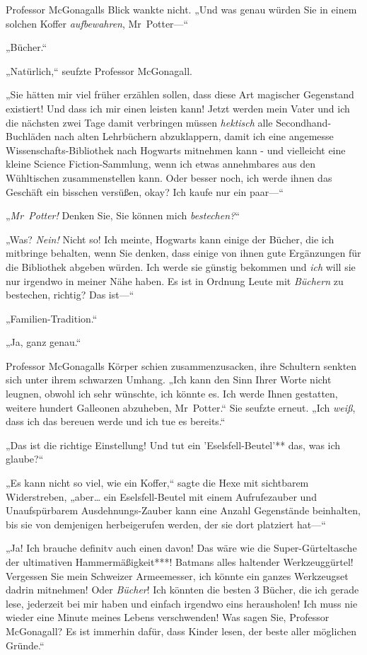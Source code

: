 {Professor McGonagalls Blick wankte nicht. „Und was genau würden Sie in einem solchen Koffer \emph{aufbewahren}, Mr~Potter—“

„Bücher.“

„Natürlich,“ seufzte Professor McGonagall.

„Sie hätten mir viel früher erzählen sollen, dass diese Art magischer Gegenstand existiert! Und dass ich mir einen leisten kann! Jetzt werden mein Vater und ich die nächsten zwei Tage damit verbringen müssen \emph{hektisch} alle Secondhand-Buchläden nach alten Lehrbüchern abzuklappern, damit ich eine angemesse Wissenschafts-Bibliothek nach Hogwarts mitnehmen kann - und vielleicht eine kleine Science Fiction-Sammlung, wenn ich etwas annehmbares aus den Wühltischen zusammenstellen kann. Oder besser noch, ich werde ihnen das Geschäft ein bisschen versüßen, okay? Ich kaufe nur ein paar—“

„\emph{Mr~Potter!} Denken Sie, Sie können mich \emph{bestechen?}“

„Was? \emph{Nein!} Nicht so! Ich meinte, Hogwarts kann einige der Bücher, die ich mitbringe behalten, wenn Sie denken, dass einige von ihnen gute Ergänzungen für die Bibliothek abgeben würden. Ich werde sie günstig bekommen und \emph{ich} will sie nur irgendwo in meiner Nähe haben. Es ist in Ordnung Leute mit \emph{Büchern} zu bestechen, richtig? Das ist—“

„Familien-Tradition.“

„Ja, ganz genau.“

Professor McGonagalls Körper schien zusammenzusacken, ihre Schultern senkten sich unter ihrem schwarzen Umhang. „Ich kann den Sinn Ihrer Worte nicht leugnen, obwohl ich sehr wünschte, ich könnte es. Ich werde Ihnen gestatten, weitere hundert Galleonen abzuheben, Mr~Potter.“ Sie seufzte erneut. „Ich \emph{weiß}, dass ich das bereuen werde und ich tue es bereits.“

„Das ist die richtige Einstellung! Und tut ein 'Eselsfell-Beutel'** das, was ich glaube?“

„Es kann nicht so viel, wie ein Koffer,“ sagte die Hexe mit sichtbarem Widerstreben, „aber… ein Eselsfell-Beutel mit einem Aufrufezauber und Unaufspürbarem Ausdehnungs-Zauber kann eine Anzahl Gegenstände beinhalten, bis sie von demjenigen herbeigerufen werden, der sie dort platziert hat—“

„Ja! Ich brauche definitv auch einen davon! Das wäre wie die Super-Gürteltasche der ultimativen Hammermäßigkeit***! Batmans alles haltender Werkzeuggürtel! Vergessen Sie mein Schweizer Armeemesser, ich könnte ein ganzes Werkzeugset dadrin mitnehmen! Oder \emph{Bücher}! Ich könnten die besten 3 Bücher, die ich gerade lese, jederzeit bei mir haben und einfach irgendwo eins herausholen! Ich muss nie wieder eine Minute meines Lebens verschwenden! Was sagen Sie, Professor McGonagall? Es ist immerhin dafür, dass Kinder lesen, der beste aller möglichen Gründe.“

}
